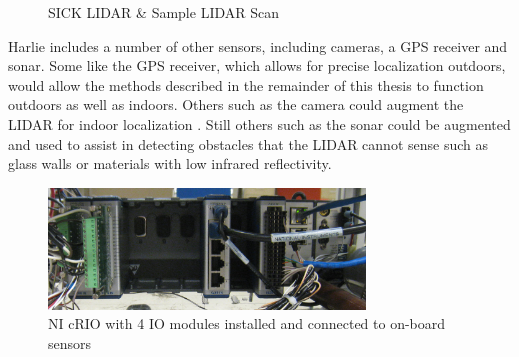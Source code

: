 \begin{figure}
\centering
{}
\hfill
{}
\caption{SICK LIDAR \& Sample LIDAR Scan}
\label{fig:sick_and_sample_scan}
\end{figure}

Harlie includes a number of other sensors, including cameras, a GPS receiver and sonar. Some like the GPS receiver, which allows for precise localization outdoors, would allow the methods described in the remainder of this thesis to function outdoors as well as indoors. Others such as the camera could augment the LIDAR for indoor localization \autocite{Harper2009}. Still others such as the sonar could be augmented and used to assist in detecting obstacles that the LIDAR cannot sense such as glass walls or materials with low infrared reflectivity.

\begin{figure}
\centering
\includegraphics[width=0.75\textwidth]{images/cRIO}
\caption{NI cRIO with 4 IO modules installed and connected to on-board sensors \label{fig:crio}}
\end{figure}

